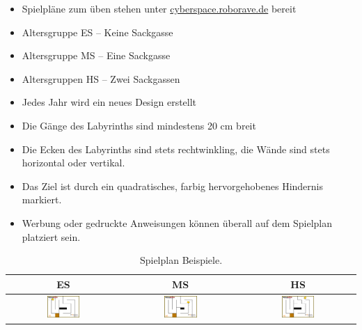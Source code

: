 \documentclass[a4paper,12pt]{article}
\begin{document}
\begin{itemize}
	\item Spielpläne zum üben stehen unter
\href{https://cyberspace.roborave.de}{cyberspace.roborave.de} bereit
	\item Altersgruppe ES – Keine Sackgasse
	\item Altersgruppe MS – Eine Sackgasse
	\item Altersgruppen HS – Zwei Sackgassen
	\item Jedes Jahr wird ein neues Design erstellt
	\item Die Gänge des Labyrinths sind mindestens 20 cm breit
	\item Die Ecken des Labyrinths sind stets rechtwinkling, die Wände sind
		stets horizontal oder vertikal.
	\item Das Ziel ist durch ein quadratisches, farbig hervorgehobenes
		Hindernis markiert.
	\item Werbung oder gedruckte Anweisungen können überall
		auf dem Spielplan platziert sein.
\end{itemize}

\begin{center}
\begin{table}
	\begin{tabular}{|c|c|c|} \hline
		ES & MS & HS \\
		\hline
\includegraphics[width=0.3\textwidth]{images/cyberspace/labyrinth_es.png}
&
\includegraphics[width=0.3\textwidth]{images/cyberspace/labyrinth_ms.png}
&
\includegraphics[width=0.3\textwidth]{images/cyberspace/labyrinth_hs.png}
\\
    		\hline
	\end{tabular}
\caption{\label{tab:table-name}Spielplan Beispiele.}
\end{table}
\end{center}
\end{document}
